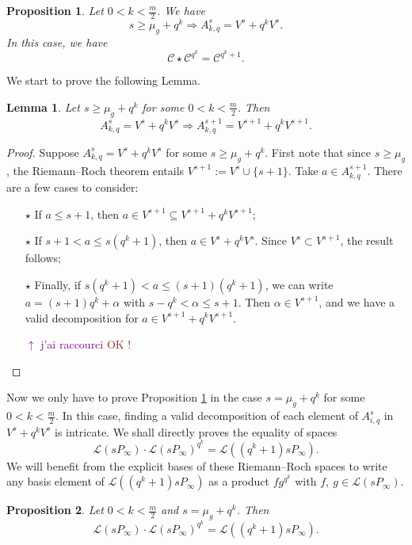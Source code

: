 \documentclass[a4paper]{article}
\newtheorem{prop1}{Proposition}
\newtheorem{lem1}{Lemma}
\newcommand{\calL}{\mathcal{L}}
\newcommand{\calC}{\mathcal{C}}
\newcommand\jade[1]{\textcolor{purple}{#1}}
\newcommand\mathieu[1]{\textcolor{brown}{#1}}
\begin{document}
\begin{prop1} \label{prop:powers_of_q's_case}
Let $0 < k < \frac{m}{2}$. We have
\[ s \geq \mu_g+q^k \Rightarrow A^s_{k,q} = V^s+q^kV^s.\]
In this case, we have 
 \[ \calC \star \calC^{q^k} = \calC^{q^k+1}.\]
\end{prop1}

We start to prove the following Lemma.

\begin{lem1} \label{technical_lemma}
Let $s \geq \mu_g+q^k$ for some $0 < k < \frac{m}{2}$. Then 
\[A^s_{k,q} = V^s+q^kV^s \Rightarrow A^{s+1}_{k,q} = V^{s+1}+q^kV^{s+1}.\]
\end{lem1}

\begin{proof}
Suppose $A^s_{k,q} = V^s+q^kV^s$ for some $s \geq \mu_g+q^k$. First note that since $s \geq \mu_g$, the Riemann--Roch theorem entails $V^{s+1} := V^s \cup \{s+1\}$. Take $a \in A^{s+1}_{k,q}$. There are a few cases to consider:
\begin{itemize}
    \item[$\star$] If $a \leq s+1$, then $a \in V^{s+1} \subseteq V^{s+1}+q^kV^{s+1}$;
    \item[$\star$] If $s+1 < a \leq s(q^k+1)$, then $a \in V^s+q^kV^s$. Since $V^s \subset V^{s+1}$, the result follows;
    \item[$\star$] Finally, if $s(q^k+1) < a \leq (s+1)(q^k+1)$, we can write $a = (s+1)q^k + \alpha$ with
    $s-q^k < \alpha \leq s+1$. Then $\alpha \in V^{s+1}$, and we have a valid decomposition for $a \in V^{s+1}+q^kV^{s+1}$.
    
    \jade{$\uparrow$ j'ai raccourci} \mathieu{OK !}
    
\end{itemize}
\end{proof}

Now we only have to prove Proposition \ref{prop:powers_of_q's_case} in the case $s=\mu_g+q^k$ for some $0 < k < \frac{m}{2}$. In this case, finding a valid decomposition of each element of $A^s_{i,q}$ in $V^s+q^kV^s$ is intricate. We shall directly proves the equality of spaces 
\[\calL(sP_{\infty}) \cdot \calL(sP_{\infty})^{q^k} =\calL((q^k+1)sP_{\infty}).\]
We will benefit from the explicit bases of these Riemann--Roch spaces to write any basis element of $\calL((q^k+1)sP_{\infty})$ as a product $fg^{q^k}$ with $f, \: g \in \calL(sP_{\infty})$.
\begin{prop1} \label{prop_avec_dessins}
Let $0 < k < \frac{m}{2}$ and $s=\mu_g+q^k$. Then 
\[\calL(sP_{\infty}) \cdot \calL(sP_{\infty})^{q^k} =\calL((q^k+1)sP_{\infty}).\]
\end{prop1}
\end{document}
